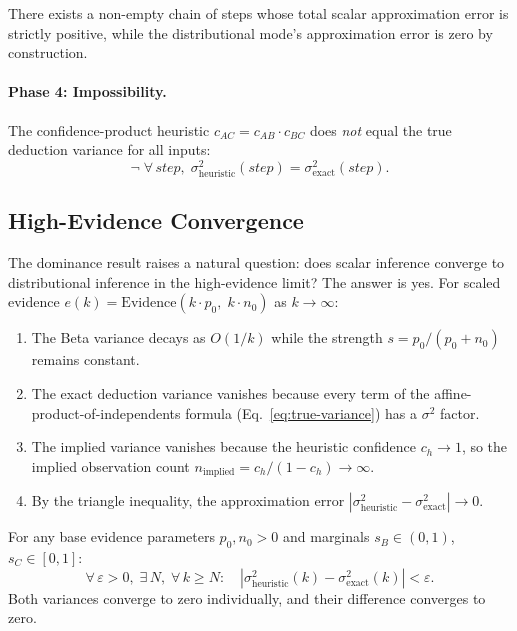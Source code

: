 \documentclass[11pt,openany]{report}
\begin{document}
\begin{theorem}
\label{thm:distributional-dominates-scalar}
There exists a non-empty chain of steps whose total scalar approximation
error is strictly positive, while the distributional mode's approximation
error is zero by construction.
\end{theorem}

\paragraph{Phase 4: Impossibility.}
\begin{theorem}
\label{thm:confidence-product-not-variance-preserving}
The confidence-product heuristic $c_{AC} = c_{AB} \cdot c_{BC}$ does
\emph{not} equal the true deduction variance for all inputs:
\[
  \neg\;\forall\, \mathit{step},\;
    \sigma^2_{\mathrm{heuristic}}(\mathit{step})
    = \sigma^2_{\mathrm{exact}}(\mathit{step}).
\]
\end{theorem}

\subsection*{High-Evidence Convergence}

The dominance result raises a natural question: does scalar inference
converge to distributional inference in the high-evidence limit?  The answer
is yes.  For scaled evidence $e(k) = \mathrm{Evidence}(k \cdot p_0,\;
k \cdot n_0)$ as $k \to \infty$:

\begin{enumerate}
\item The Beta variance decays as $O(1/k)$ while the strength
  $s = p_0 / (p_0 + n_0)$ remains constant.
\item The exact deduction variance vanishes because every term of
  the affine-product-of-independents formula (Eq.~\ref{eq:true-variance})
  has a $\sigma^2$ factor.
\item The implied variance vanishes because the heuristic confidence
  $c_h \to 1$, so the implied observation count
  $n_{\mathrm{implied}} = c_h / (1 - c_h) \to \infty$.
\item By the triangle inequality, the approximation error
  $|\sigma^2_{\mathrm{heuristic}} - \sigma^2_{\mathrm{exact}}| \to 0$.
\end{enumerate}

\begin{theorem}
\label{thm:scalar-converges-to-distributional}
For any base evidence parameters $p_0, n_0 > 0$ and marginals
$s_B \in (0,1)$, $s_C \in [0,1]$:
\[
  \forall\, \varepsilon > 0,\; \exists\, N,\; \forall\, k \ge N:\quad
  |\sigma^2_{\mathrm{heuristic}}(k) - \sigma^2_{\mathrm{exact}}(k)| < \varepsilon.
\]
Both variances converge to zero individually, and their difference
converges to zero.
\end{theorem}
\end{document}
